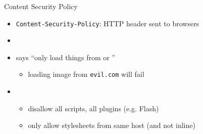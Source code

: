 \begin{frame}[fragile,label=CSPExs]{Content Security Policy}
    \begin{itemize}
        \item \texttt{Content-Security-Policy}: HTTP header sent to browsers
        \item {}
        \item says ``only load things from  or ''
            \begin{itemize}
            \item loading image from \texttt{evil.com} will fail
            \end{itemize}
        \item {}
            \begin{itemize}
            \item disallow all scripts, all plugins (e.g. Flash)
            \item only allow stylesheets from same host (and not inline)
            \end{itemize}
    \end{itemize}

\end{frame}

